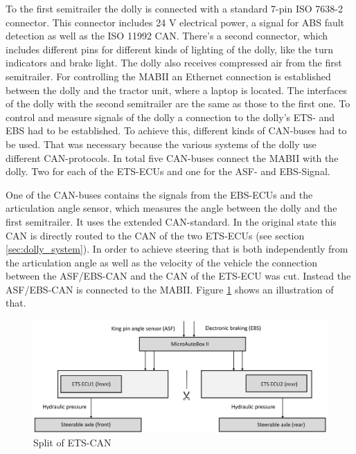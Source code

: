 \documentclass[ExampleMasters.tex]{subfiles}
\begin{document}
To the first semitrailer the dolly is connected with a standard 7-pin ISO 7638-2 connector. This connector includes 24 V electrical power, a signal for \gls{ABS} fault detection as well as the ISO 11992 CAN.
There's a second connector, which includes different pins for different kinds of lighting of the dolly, like the turn indicators and brake light.
The dolly also receives compressed air from the first semitrailer.
For controlling the \gls{MABII} an Ethernet connection is established between the dolly and the tractor unit, where a laptop is located. 
The interfaces of the dolly with the second semitrailer are the same as those to the first one.  
To control and measure signals of the dolly a connection to the dolly's \gls{ETS}- and \gls{EBS} had to be established. To achieve this, different kinds of \gls{CAN}-buses had to be used. That was necessary because the various systems of the dolly use different CAN-protocols. In total five \gls{CAN}-buses connect the \gls{MABII} with the dolly. Two for each of the \gls{ETS}-\gls{ECU}s and one for the \gls{ASF}- and \gls{EBS}-Signal.


One of the \gls{CAN}-buses contains the signals from the EBS-ECUs and the articulation angle sensor, which measures the angle between the dolly and the first semitrailer. It uses the extended CAN-standard. In the original state this \gls{CAN} is directly routed to the \gls{CAN} of the two \gls{ETS}-\gls{ECU}s (see section \ref{sec:dolly_system}). In order to achieve steering that is both independently from the articulation angle as well as the velocity of the vehicle the connection between the \gls{ASF}/\gls{EBS}-\gls{CAN} and the \gls{CAN} of the \gls{ETS}-\gls{ECU} was cut. Instead the ASF/EBS-\gls{CAN} is connected to the \gls{MABII}. Figure \ref{fig:dolly_split} shows an illustration of that.\\

\begin{figure}[!htb]
	\centering
	\includegraphics[width=1\linewidth]{figures/dolly_split}
	\caption{Split of \gls{ETS}-\gls{CAN}}
	\label{fig:dolly_split}
\end{figure}  
\end{document}
